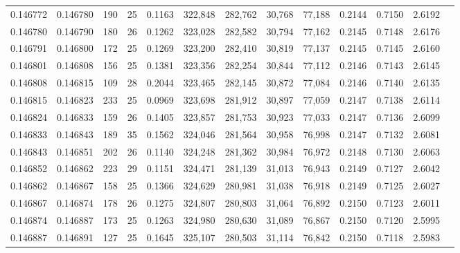\begin{tabular}{rrrrrrrrrrrrr}
0.146772 & 0.146780 & 190 &  25 &                                     0.1163 & 322,848 & 282,762 &  30,768 &  77,188 & 0.2144 & 0.7150 & 2.6192 \\
0.146780 & 0.146790 & 180 &  26 &                                     0.1262 & 323,028 & 282,582 &  30,794 &  77,162 & 0.2145 & 0.7148 & 2.6176 \\
0.146791 & 0.146800 & 172 &  25 &                                     0.1269 & 323,200 & 282,410 &  30,819 &  77,137 & 0.2145 & 0.7145 & 2.6160 \\
0.146801 & 0.146808 & 156 &  25 &                                     0.1381 & 323,356 & 282,254 &  30,844 &  77,112 & 0.2146 & 0.7143 & 2.6145 \\
0.146808 & 0.146815 & 109 &  28 &                                     0.2044 & 323,465 & 282,145 &  30,872 &  77,084 & 0.2146 & 0.7140 & 2.6135 \\
0.146815 & 0.146823 & 233 &  25 &                                     0.0969 & 323,698 & 281,912 &  30,897 &  77,059 & 0.2147 & 0.7138 & 2.6114 \\
0.146824 & 0.146833 & 159 &  26 &                                     0.1405 & 323,857 & 281,753 &  30,923 &  77,033 & 0.2147 & 0.7136 & 2.6099 \\
0.146833 & 0.146843 & 189 &  35 &                                     0.1562 & 324,046 & 281,564 &  30,958 &  76,998 & 0.2147 & 0.7132 & 2.6081 \\
0.146843 & 0.146851 & 202 &  26 &                                     0.1140 & 324,248 & 281,362 &  30,984 &  76,972 & 0.2148 & 0.7130 & 2.6063 \\
0.146852 & 0.146862 & 223 &  29 &                                     0.1151 & 324,471 & 281,139 &  31,013 &  76,943 & 0.2149 & 0.7127 & 2.6042 \\
0.146862 & 0.146867 & 158 &  25 &                                     0.1366 & 324,629 & 280,981 &  31,038 &  76,918 & 0.2149 & 0.7125 & 2.6027 \\
0.146867 & 0.146874 & 178 &  26 &                                     0.1275 & 324,807 & 280,803 &  31,064 &  76,892 & 0.2150 & 0.7123 & 2.6011 \\
0.146874 & 0.146887 & 173 &  25 &                                     0.1263 & 324,980 & 280,630 &  31,089 &  76,867 & 0.2150 & 0.7120 & 2.5995 \\
0.146887 & 0.146891 & 127 &  25 &                                     0.1645 & 325,107 & 280,503 &  31,114 &  76,842 & 0.2150 & 0.7118 & 2.5983 \\

\end{tabular}
